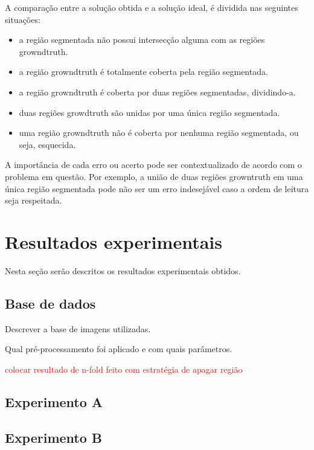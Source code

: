 \documentclass[a4paper,11pt]{article}
\newcommand{\TODO}[1]{\textcolor{red}{#1}}
\begin{document}
      A comparação entre a solução obtida e a solução ideal, é dividida nas seguintes situações:

      \begin{itemize}
        \item a região segmentada não possui intersecção alguma com as regiões growndtruth.
        \item a região growndtruth é totalmente coberta pela região segmentada.
        \item a região growndtruth é coberta por duas regiões segmentadas, dividindo-a.
        \item duas regiões growdtruth são unidas por uma única região segmentada.
        \item uma região growndtruth não é coberta por nenhuma região segmentada, ou seja, esquecida.
      \end{itemize}

      A importância de cada erro ou acerto pode ser contextualizado de acordo com o problema em questão. Por exemplo, a união de duas regiões growntruth em uma única região segmentada pode não ser um erro indesejável caso a ordem de leitura seja respeitada.





\section{Resultados experimentais}

Nesta seção serão descritos os resultados experimentais obtidos.

\subsection{Base de dados}
Descrever a base de imagens utilizadas.

Qual pré-processamento foi aplicado e com quais parâmetros.


\TODO{colocar resultado de n-fold feito com estratégia de apagar região}

\subsection{Experimento A}

\subsection{Experimento B}
\end{document}
